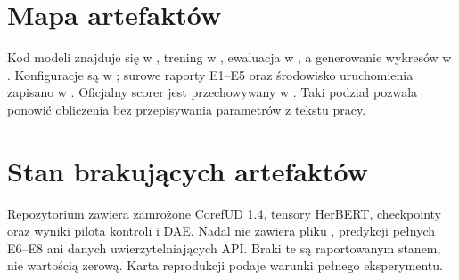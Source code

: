 \section{Mapa artefaktów}

Kod modeli znajduje się w , trening w , ewaluacja w , a generowanie wykresów w . Konfiguracje są w ; surowe raporty E1--E5 oraz środowisko uruchomienia zapisano w . Oficjalny scorer jest przechowywany w . Taki podział pozwala ponowić obliczenia bez przepisywania parametrów z tekstu pracy.

\section{Stan brakujących artefaktów}

Repozytorium zawiera zamrożone CorefUD 1.4, tensory HerBERT, checkpointy oraz wyniki pilota kontroli i DAE. Nadal nie zawiera pliku , predykcji pełnych E6--E8 ani danych uwierzytelniających API. Braki te są raportowanym stanem, nie wartością zerową. Karta reprodukcji podaje warunki pełnego eksperymentu.
